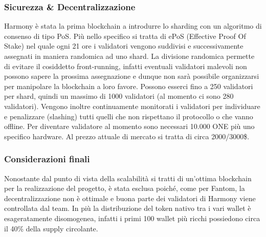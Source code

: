 \documentclass[a4paper, 12pt]{article}
\begin{document}
\subsubsection*{Sicurezza \& Decentralizzazione}
Harmony è stata la prima blockchain a introdurre lo sharding con un algoritmo di consenso di tipo PoS. Più nello specifico si tratta di ePoS (Effective Proof Of Stake) nel quale ogni 21 ore i validatori vengono suddivisi e successivamente assegnati in maniera randomica ad uno shard. La divisione randomica permette di evitare il cosiddetto front-running, infatti eventuali validatori malevoli non possono sapere la prossima assegnazione e dunque non sarà possibile organizzarsi per manipolare la blockchain a loro favore.
Possono esserci fino a 250 validatori per shard, quindi un massimo di 1000 validatori (al momento ci sono 280 validatori).
Vengono inoltre continuamente monitorati i validatori per individuare e penalizzare (slashing) tutti quelli che non rispettano il protocollo o che vanno offline.
Per diventare validatore al momento sono necessari 10.000 ONE più uno specifico hardware. Al prezzo attuale di mercato si tratta di circa 2000/3000\$.
\subsubsection*{Considerazioni finali}
Nonostante dal punto di vista della scalabilità si tratti di un'ottima blockchain per la realizzazione del progetto, è stata esclusa poiché, come per Fantom, la decentralizzazione non è ottimale e buona parte dei validatori di Harmony viene controllata dal team. In più la distribuzione del token nativo tra i vari wallet è esageratamente disomogenea, infatti i primi 100 wallet più ricchi possiedono circa il 40\% della supply circolante.

\newpage
\end{document}
